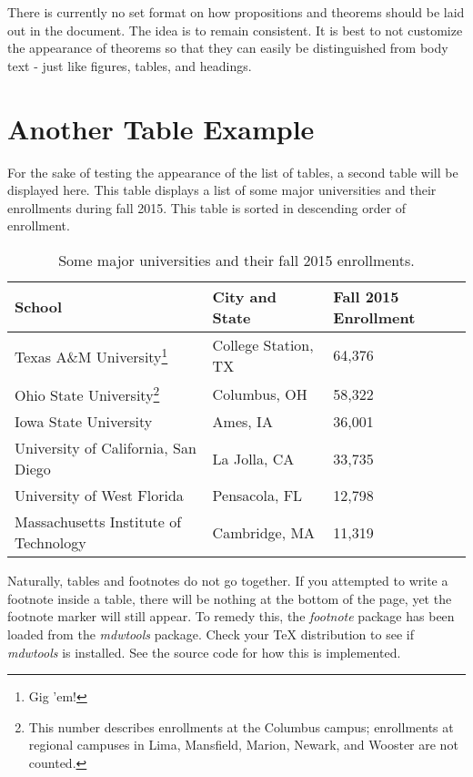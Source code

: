 There is currently no set format on how propositions and theorems should be laid out in the document. The idea is to remain consistent. It is best to not customize the appearance of theorems so that they can easily be distinguished from body text - just like figures, tables, and headings.

\section{Another Table Example}
For the sake of testing the appearance of the list of tables, a second table will be displayed here. This table displays a list of some major universities and their enrollments during fall 2015. This table is sorted in descending order of enrollment.
\begin{savenotes}
\begin{table}[!htb]
	\centering
	\label{my-label}
	\begin{tabular}{|l|l|l|}
		\hline
		School & City and State & Fall 2015 Enrollment  \\ \hline
		Texas A\&M University\footnote{Gig 'em!} & College Station, TX & 64,376  \\ \hline
		Ohio State University\footnote{This number describes enrollments at the Columbus campus; enrollments at regional campuses in Lima, Mansfield, Marion, Newark, and Wooster are not counted.} & Columbus, OH & 58,322 \\ \hline
		Iowa State University & Ames, IA & 36,001 \\ \hline
		University of California, San Diego & La Jolla, CA & 33,735   \\ \hline
		University of West Florida & Pensacola, FL & 12,798 \\ \hline
		Massachusetts Institute of Technology & Cambridge, MA & 11,319   \\ \hline
	\end{tabular}
	\caption{Some major universities and their fall 2015 enrollments.}
\end{table}
\end{savenotes}

Naturally, tables and footnotes do not go together. If you attempted to write a footnote inside a table, there will be nothing at the bottom of the page, yet the footnote marker will still appear. To remedy this, the \textit{footnote} package has been loaded from the \textit{mdwtools} package. Check your TeX distribution to see if \textit{mdwtools} is installed. See the source code for how this is implemented.